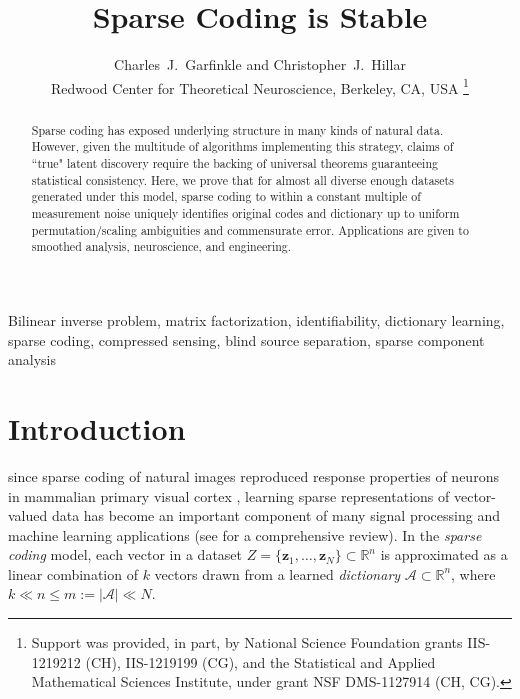 \documentclass[journal, twocolumn]{IEEEtran}
\begin{document}
\title{Sparse Coding is Stable}

\author{Charles~J.~Garfinkle and Christopher~J.~Hillar \\
Redwood Center for Theoretical Neuroscience, Berkeley, CA, USA
\thanks{%
Support was provided, in part, by National Science Foundation grants IIS-1219212 (CH), IIS-1219199 (CG), and the   
Statistical and Applied Mathematical Sciences Institute, under grant NSF DMS-1127914 (CH, CG).}}

\maketitle

\begin{abstract}
Sparse coding has exposed underlying structure in many kinds of natural data.  However, given the multitude of algorithms implementing this strategy, claims of ``true" latent discovery require the backing of universal theorems guaranteeing statistical consistency.  Here, we prove that for almost all diverse enough datasets generated under this model, sparse coding to within a constant multiple of measurement noise uniquely identifies original codes and dictionary up to uniform permutation/scaling ambiguities and commensurate error.  Applications are given to smoothed analysis, neuroscience, and engineering.
\end{abstract}

\begin{IEEEkeywords}
Bilinear inverse problem, matrix factorization, identifiability, dictionary learning, sparse coding, compressed sensing, blind source separation, sparse component analysis
\end{IEEEkeywords}


\section{Introduction}
 since sparse coding of natural images reproduced response properties of neurons in mammalian primary visual cortex \cite{Olshausen96}, learning sparse representations of vector-valued data has become an important component of many signal processing and machine learning applications (see \cite{Zhang15} for a comprehensive review). In the \textit{sparse coding} model, each vector in a dataset $Z = \{\mathbf{z}_1, \ldots, \mathbf{z}_N\} \subset \mathbb{R}^n$ is approximated as a linear combination of $k$ vectors drawn from a learned \emph{dictionary} $\mathcal{A} \subset \mathbb{R}^n$, where $k \ll n \leq m:= |\mathcal{A}| \ll N$. 
\end{document}
